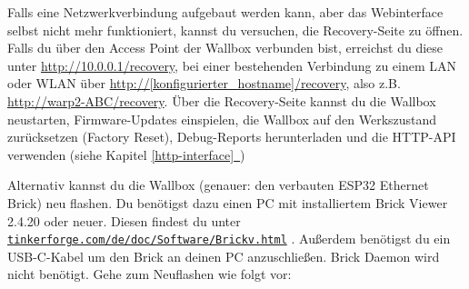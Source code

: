 \documentclass[a4paper,10pt]{article}
\newcommand*{\fullref}[1]{\hyperref[{#1}]{\ref*{#1}~\nameref*{#1}}}
\newcommand\rurl[2]{%
  \href{#1}{\nolinkurl{#2}}%
}
\begin{document}
\begin{multicols*}{2}
	Falls eine Netzwerkverbindung aufgebaut werden kann, aber das Webinterface selbst nicht mehr funktioniert, kannst du versuchen, die Recovery-Seite zu öffnen.
	Falls du über den Access Point der Wallbox verbunden bist, erreichst du diese unter \url{http://10.0.0.1/recovery},
	bei einer bestehenden Verbindung zu einem LAN oder WLAN über \url{http://[konfigurierter_hostname]/recovery}, also z.B. \url{http://warp2-ABC/recovery}.
	Über die Recovery-Seite kannst du die Wallbox neustarten, Firmware-Updates einspielen,
	die Wallbox auf den Werkszustand zurücksetzen (Factory Reset), Debug-Reports
	herunterladen und die HTTP-API verwenden (siehe Kapitel \fullref{http-interface})

	Alternativ kannst du die Wallbox (genauer: den verbauten ESP32 Ethernet
	Brick) neu flashen.
	Du benötigst dazu einen PC mit installiertem Brick Viewer 2.4.20 oder neuer. Diesen findest du unter
	\rurl{https://www.tinkerforge.com/de/doc/Software/Brickv.html}{tinkerforge.com/de/doc/Software/Brickv.html}.
	Außerdem benötigst du ein USB-C-Kabel um den Brick an deinen PC anzuschließen. Brick Daemon wird nicht benötigt.
	Gehe zum Neuflashen wie folgt vor:



\end{multicols*}
\end{document}
